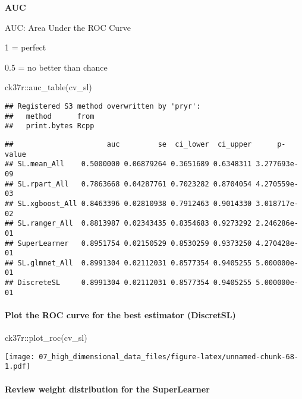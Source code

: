 \documentclass[
]{book}
\newenvironment{Shaded}{\begin{snugshade}}{\end{snugshade}}
\newcommand{\FunctionTok}[1]{\textcolor[rgb]{0.00,0.00,0.00}{#1}}
\newcommand{\NormalTok}[1]{#1}
\newcommand{\SpecialCharTok}[1]{\textcolor[rgb]{0.00,0.00,0.00}{#1}}
\begin{document}
\textbf{AUC}

AUC: Area Under the ROC Curve

1 = perfect

0.5 = no better than chance

\begin{Shaded}
\begin{Highlighting}[]
\NormalTok{ck37r}\SpecialCharTok{::}\FunctionTok{auc\_table}\NormalTok{(cv\_sl)}
\end{Highlighting}
\end{Shaded}

\begin{verbatim}
## Registered S3 method overwritten by 'pryr':
##   method      from
##   print.bytes Rcpp
\end{verbatim}

\begin{verbatim}
##                      auc         se  ci_lower  ci_upper      p-value
## SL.mean_All    0.5000000 0.06879264 0.3651689 0.6348311 3.277693e-09
## SL.rpart_All   0.7863668 0.04287761 0.7023282 0.8704054 4.270559e-03
## SL.xgboost_All 0.8463396 0.02810938 0.7912463 0.9014330 3.018717e-02
## SL.ranger_All  0.8813987 0.02343435 0.8354683 0.9273292 2.246286e-01
## SuperLearner   0.8951754 0.02150529 0.8530259 0.9373250 4.270428e-01
## SL.glmnet_All  0.8991304 0.02112031 0.8577354 0.9405255 5.000000e-01
## DiscreteSL     0.8991304 0.02112031 0.8577354 0.9405255 5.000000e-01
\end{verbatim}

\hypertarget{plot-the-roc-curve-for-the-best-estimator-discretsl}{%
\paragraph{Plot the ROC curve for the best estimator (DiscretSL)}\label{plot-the-roc-curve-for-the-best-estimator-discretsl}}

\begin{Shaded}
\begin{Highlighting}[]
\NormalTok{ck37r}\SpecialCharTok{::}\FunctionTok{plot\_roc}\NormalTok{(cv\_sl)}
\end{Highlighting}
\end{Shaded}

\texttt{[image: 07\_high\_dimensional\_data\_files/figure-latex/unnamed-chunk-68-1.pdf]}

\hypertarget{review-weight-distribution-for-the-superlearner}{%
\paragraph{Review weight distribution for the SuperLearner}\label{review-weight-distribution-for-the-superlearner}}
\end{document}
